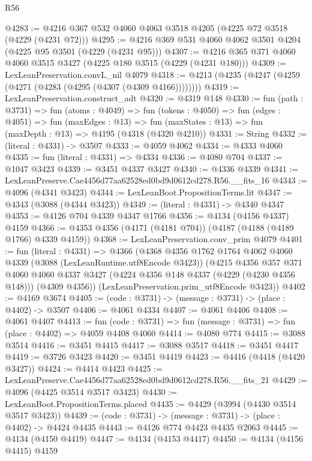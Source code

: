 \begin{lexlean}{R56}
\begin{coremodule}
@4283 := @4216 @367 @532 @4060 @4063 @3518 @4205 (@4225 @72 @3518 (@4229 (@4231 @72)))
@4295 := @4216 @369 @531 @4060 @4062 @3501 @4204 (@4225 @95 @3501 (@4229 (@4231 @95)))
@4307 := @4216 @365 @371 @4060 @4060 @3515 @3427 (@4225 @180 @3515 (@4229 (@4231 @180)))
@4309 := LexLeanPreservation.convL_nil @4079
@4318 := @4213 (@4235 (@4247 (@4259 (@4271 (@4283 (@4295 (@4307 (@4309 @4166))))))))
@4319 := LexLeanPreservation.construct_adt
@4320 := @4319 @148
@4330 := fun (path : @3731) =>
  fun (atoms : @4049) =>
  fun (tokens : @4050) =>
  fun (edges : @4051) =>
  fun (maxEdges : @13) =>
  fun (maxStates : @13) => fun (maxDepth : @13) => @4195 (@4318 (@4320 @4210))
@4331 := String
@4332 := (literal : @4331) -> @3507
@4333 := @4059 @4062
@4334 := @4333 @4060
@4335 := fun (literal : @4331) => @4334
@4336 := @4080 @704
@4337 := @1047 @3423
@4339 := @3451 @4337 @3427
@4340 := @4336 @4339
@4341 := LexLeanPreserve.Cae4456d77aa62528ed0bd9d0612cd278.R56.__fits_16
@4343 := @4096 (@4341 @3423)
@4344 := LexLeanBoot.PropositionTerms.lit
@4347 := @4343 (@3088 (@4344 @3423))
@4349 := (literal : @4331) -> @4340 @4347
@4353 := @4126 @704 @4339 @4347 @1766
@4356 := @4134 (@4156 @4337) @4159
@4366 := @4353 @4356 (@4171 (@4181 @704)) (@4187 (@4188 (@4189 @1766) @4339 @4159))
@4368 := LexLeanPreservation.conv_prim @4079
@4401 := fun (literal : @4331) =>
  @4366
    (@4368
      @4356
      @1762
      @1764
      @4062
      @4060
      @4339
      (@3088 (LexLeanRuntime.utf8Encode @3423))
      (@4215
        @4356
        @357
        @371
        @4060
        @4060
        @4337
        @3427
        (@4224 @4356 @148 @4337 (@4229 (@4230 @4356 @148)))
        (@4309 @4356))
      (LexLeanPreservation.prim_utf8Encode @3423))
@4402 := @4169 @3674
@4405 := (code : @3731) -> (message : @3731) -> (place : @4402) -> @3507
@4406 := @4061 @4334
@4407 := @4061 @4406
@4408 := @4061 @4407
@4413 := fun (code : @3731) => fun (message : @3731) => fun (place : @4402) => @4059 @4408 @4060
@4414 := @4080 @774
@4415 := @3088 @3514
@4416 := @3451 @4415
@4417 := @3088 @3517
@4418 := @3451 @4417
@4419 := @3726 @3423
@4420 := @3451 @4419
@4423 := @4416 (@4418 (@4420 @3427))
@4424 := @4414 @4423
@4425 := LexLeanPreserve.Cae4456d77aa62528ed0bd9d0612cd278.R56.__fits_21
@4429 := @4096 (@4425 @3514 @3517 @3423)
@4430 := LexLeanBoot.PropositionTerms.placed
@4435 := @4429 (@3994 (@4430 @3514 @3517 @3423))
@4439 := (code : @3731) -> (message : @3731) -> (place : @4402) -> @4424 @4435
@4443 := @4126 @774 @4423 @4435 @2063
@4445 := @4134 (@4150 @4419)
@4447 := @4134 (@4153 @4417)
@4450 := @4134 (@4156 @4415) @4159

\end{coremodule}
\end{lexlean}
